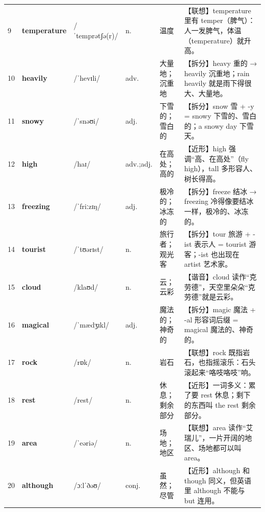 \documentclass[UTF8,a4paper,11pt,oneside]{ctexbook}
\newcommand{\cellword}[1]{{\bfseries\textcolor{wordcol}{#1}}}
\newcommand{\cellipa}[1]{{\footnotesize\textcolor{ipacol}{#1}}}
\newcommand{\cellpos}[1]{\textcolor{poscol}{#1}}
\newcommand{\cellno}[1]{\textcolor{volcolor!75!black}{#1}}
\begin{document}
{\begin{longtable}{@{}C{0.045\textwidth}L{0.155\textwidth}L{0.175\textwidth}C{0.070\textwidth}L{0.180\textwidth}L{0.282\textwidth}@{}}
 \cellno{9} & \cellword{temperature} & \cellipa{/ˈtemprətʃə(r)/} & \cellpos{n.} & 温度 & \textcolor{tagAssoc}{【联想】}temperature 里有 temper（脾气）：人一发脾气，体温（temperature）就升高。 \\
\cellno{10} & \cellword{heavily} & \cellipa{/ˈhevɪli/} & \cellpos{adv.} & 大量地；沉重地 & \textcolor{tagSplit}{【拆分】}heavy 重的 →\allowbreak{} heavily 沉重地；rain heavily 就是雨下得很大、大量地。 \\
 \cellno{11} & \cellword{snowy} & \cellipa{/ˈsnəʊi/} & \cellpos{adj.} & 下雪的；雪白的 & \textcolor{tagSplit}{【拆分】}snow 雪 + -y = snowy 下雪的、雪白的；a snowy day 下雪天。 \\
\cellno{12} & \cellword{high} & \cellipa{/haɪ/} & \cellpos{adv.;\allowbreak{}adj.} & 在高处；高的 & \textcolor{tagNear}{【近形】}high 强调“高、在高处”（fly high），tall 多形容人、树长得高。 \\
 \cellno{13} & \cellword{freezing} & \cellipa{/ˈfriːzɪŋ/} & \cellpos{adj.} & 极冷的；冰冻的 & \textcolor{tagSplit}{【拆分】}freeze 结冰 →\allowbreak{} freezing 冷得像要结冰一样，极冷的、冰冻的。 \\
\cellno{14} & \cellword{tourist} & \cellipa{/ˈtʊərɪst/} & \cellpos{n.} & 旅行者；观光客 & \textcolor{tagSplit}{【拆分】}tour 旅游 + -ist 表示人 = tourist 游客；-ist 也出现在 artist 艺术家。 \\
 \cellno{15} & \cellword{cloud} & \cellipa{/klaʊd/} & \cellpos{n.} & 云；云彩 & \textcolor{tagSound}{【谐音】}cloud 读作“克劳德”，天空里朵朵“克劳德”就是云彩。 \\
\cellno{16} & \cellword{magical} & \cellipa{/ˈmædʒɪkl/} & \cellpos{adj.} & 魔法的；神奇的 & \textcolor{tagSplit}{【拆分】}magic 魔法 + -al 形容词后缀 = magical 魔法的、神奇的。 \\
 \cellno{17} & \cellword{rock} & \cellipa{/rɒk/} & \cellpos{n.} & 岩石 & \textcolor{tagAssoc}{【联想】}rock 既指岩石，也指摇滚乐：石头滚起来“咯吱咯吱”响。 \\
\cellno{18} & \cellword{rest} & \cellipa{/rest/} & \cellpos{n.} & 休息；剩余部分 & \textcolor{tagNear}{【近形】}一词多义：累了要 rest 休息；剩下的东西叫 the rest 剩余部分。 \\
 \cellno{19} & \cellword{area} & \cellipa{/ˈeəriə/} & \cellpos{n.} & 场地；地区 & \textcolor{tagAssoc}{【联想】}area 读作“艾瑞儿”，一片开阔的地区、场地都可以叫 area。 \\
\cellno{20} & \cellword{although} & \cellipa{/ɔːlˈðəʊ/} & \cellpos{conj.} & 虽然；尽管 & \textcolor{tagNear}{【近形】}although 和 though 同义，但英语里 although 不能与 but 连用。 \\

\end{longtable}}
\end{document}
